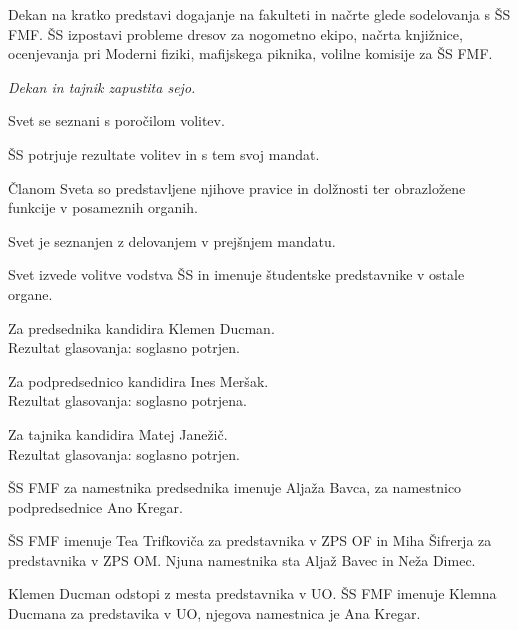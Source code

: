 \documentclass{seja}
\begin{document}
\begin{ad}
\item
  Dekan na kratko predstavi dogajanje na fakulteti in načrte glede sodelovanja s ŠS FMF.
  ŠS izpostavi probleme dresov za nogometno ekipo, načrta knjižnice, ocenjevanja pri Moderni
  fiziki, mafijskega piknika, volilne komisije za ŠS FMF.

  \textit{Dekan in tajnik zapustita sejo.}

\item Svet se seznani s poročilom volitev.
  \begin{sklep*}
    ŠS potrjuje rezultate volitev in s tem svoj mandat.
  \end{sklep*}

\item
  Članom Sveta so predstavljene njihove pravice in dolžnosti ter obrazložene
  funkcije v posameznih organih.

\item
  Svet je seznanjen z delovanjem v prejšnjem mandatu.

\item
  Svet izvede volitve vodstva ŠS in imenuje študentske predstavnike v ostale organe.

  Za predsednika kandidira Klemen Ducman.  \\
  Rezultat glasovanja: soglasno potrjen.

  Za podpredsednico kandidira Ines Meršak. \\
  Rezultat glasovanja: soglasno potrjena.

  Za tajnika kandidira Matej Janežič. \\
  Rezultat glasovanja: soglasno potrjen.

  \begin{sklep*}
    ŠS FMF za namestnika predsednika imenuje Aljaža Bavca, za namestnico podpredsednice Ano Kregar.
  \end{sklep*}

  \begin{sklep*}
    ŠS FMF imenuje Tea Trifkoviča za predstavnika v ZPS OF in Miha Šifrerja za predstavnika v ZPS OM.
    Njuna namestnika sta Aljaž Bavec in Neža Dimec.
  \end{sklep*}

  \begin{sklep*}
    Klemen Ducman odstopi z mesta predstavnika v UO.
    ŠS FMF imenuje Klemna Ducmana za predstavika v UO, njegova namestnica je Ana Kregar.
  \end{sklep*}


\end{ad}
\end{document}
